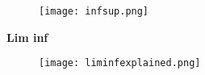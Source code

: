 \documentclass{article}
\numberwithin{equation}{section}
\begin{document}
\begin{flushleft}
\begin{figure}[H]
\texttt{[image: infsup.png]}
\end{figure}
\medbreak
\textbf{Lim inf}
\begin{figure}[H]
	\texttt{[image: liminfexplained.png]}
\end{figure}






\end{flushleft}
\end{document}
